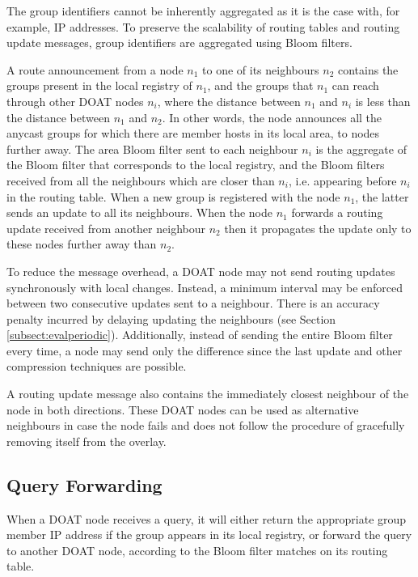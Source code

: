 The group identifiers cannot be inherently aggregated as it is the case
with, for example, IP addresses. To preserve the scalability of routing
tables and routing update messages, group identifiers are aggregated using
Bloom filters. 

A route announcement from a node $n_1$ to one of its neighbours $n_2$ contains
the groups present in the local registry of $n_1$, and the groups that $n_1$
can reach through other DOAT nodes $n_i$, where the distance between 
$n_1$ and $n_i$ is less than the distance between $n_1$ and $n_2$. In other words, the node
announces all the anycast groups for which there are member hosts in its
local area, to nodes further away.  The area Bloom filter sent to
each neighbour $n_i$ is the aggregate of the Bloom filter that corresponds to the local registry, and the Bloom
filters received from all the neighbours which are closer than $n_i$,
i.e. appearing before $n_i$ in the routing table. 
When a new group is registered with the node $n_1$, the latter sends an update to all its neighbours.
When the node $n_1$ forwards a routing update received from another neighbour $n_2$
then it propagates the update only to these nodes further away than $n_2$.

To reduce the message overhead, a DOAT node may not send routing updates
synchronously with local changes. Instead, a minimum interval may be enforced
between two consecutive updates sent to a neighbour. There is an
accuracy penalty incurred by delaying updating the neighbours
(see Section \ref{subsect:evalperiodic}).
Additionally, instead of sending the entire
Bloom filter every time, a node may send only the difference since the last
update and other compression techniques are possible.


A routing update message also contains the
immediately closest neighbour of the node in both directions. 
These DOAT nodes can be used as alternative neighbours in case the
node fails and does not follow the procedure of gracefully removing itself
from the overlay.

\subsection{Query Forwarding}
\label{subsect:querying}

When a DOAT node receives a query, it will either return the appropriate
group member IP address if the group appears in its local registry, or
forward the query to another DOAT node, according to the Bloom filter
matches on its routing table.

